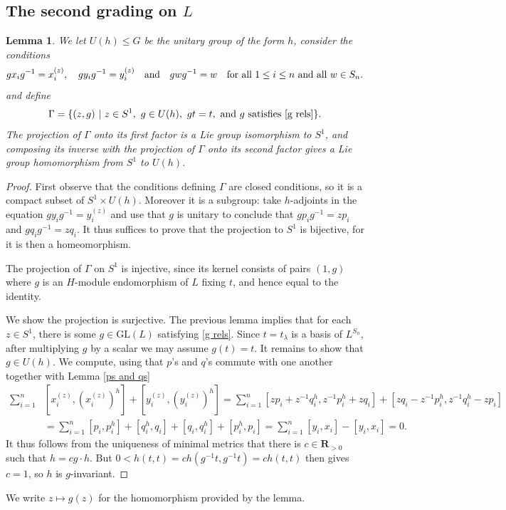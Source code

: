 \documentclass[12pt, reqno]{amsart}
\numberwithin{equation}{section}
\theoremstyle{definition}
\theoremstyle{plain}
\newtheorem{lemma}[theorem]{Lemma}
\newcommand{\RR}{\mathbf{R}}
\begin{document}
\subsection{The second grading on $L$} 

\begin{lemma}
We let $U(h) \leq G$ be the unitary group of the form $h$, consider the conditions 
\begin{equation} \label{g rels} g x_i g^{-1}=x_i^{(z)}, \quad g y_i g^{-1}=y_i^{(z)} \quad \text{and} \quad g w g^{-1}=w \quad \hbox{for all $1 \leq i \leq n$ and all $w \in S_n$.} \end{equation}
and define 
$$\Gamma=\{(z,g) \ | \ z \in S^1, \ g \in U(h), \ gt=t, \ \hbox{and $g$ satisfies \eqref{g rels}} \}.$$ The projection of $\Gamma$ onto its first factor is a Lie group isomorphism to $S^1$, and composing its inverse with the projection of $\Gamma$ onto its second factor gives a Lie group homomorphism from $S^1$ to $U(h)$.
\end{lemma}

\begin{proof}
First observe that the conditions defining $\Gamma$ are closed conditions, so it is a compact subset of $S^1 \times U(h)$. Moreover it is a subgroup: take $h$-adjoints in the equation $g y_i g^{-1}=y_i^{(z)}$ and use that $g$ is unitary to conclude that $gp_i g^{-1}=zp_i$ and $gq_i g^{-1}=zq_i$. It thus suffices to prove that the projection to $S^1$ is bijective, for it is then a homeomorphism.

The projection of $\Gamma$ on $S^1$ is injective, since its kernel consists of pairs $(1,g)$ where $g$ is an $H$-module endomorphism of $L$ fixing $t$, and hence equal to the identity.

We show the projection is surjective. The previous lemma implies that for each $z \in S^1$, there is some $g \in \mathrm{GL}(L)$ satisfying \eqref{g rels}. Since $t=t_\lambda$ is a basis of $L^{S_n}$, after multiplying $g$ by a scalar we may assume $g(t)=t$. It remains to show that $g \in U(h)$. We compute, using that $p$'s and $q$'s commute with one another together with Lemma \ref{ps and qs}
\begin{align*}
\sum_{i=1}^n & [x_i^{(z)},(x_i^{(z)})^h]+[y_i^{(z)},(y_i^{(z)})^h]=\sum_{i=1}^n [z p_i+z^{-1}q_i^h,z^{-1} p_i^h+z q_i]+[zq_i-z^{-1} p_i^h,z^{-1} q_i^h-z p_i] \\
&=\sum_{i=1}^n [p_i,p_i^h]+[q_i^h,q_i]+[q_i,q_i^h]+[p_i^h,p_i]=\sum_{i=1}^n [y_i,x_i]-[y_i,x_i]=0.
\end{align*} It thus follows from the uniqueness of minimal metrics that there is $c \in \RR_{>0}$ such that $h=c g \cdot h$. But $0<h(t,t)=c h(g^{-1} t,g^{-1}t)=c h(t,t)$ then gives $c=1$, so $h$ is $g$-invariant. \end{proof} We write $z \mapsto g(z)$ for the homomorphism provided by the lemma. 
\end{document}
